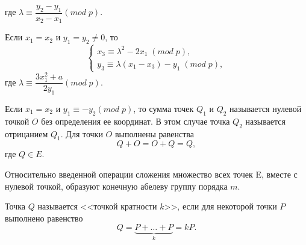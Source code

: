где $\lambda \equiv \dfrac{y_2-y_1}{x_2-x_1}(mod\;p)$.
\\
\par
Если $x_1 = x_2$ и $y_1 = y_2 \neq 0$, то
\begin{equation}
\begin{cases}
x_3 \equiv \lambda^2 - 2x_1\;(mod\;p),\\
y_3 \equiv \lambda(x_1-x_3) - y_1\;(mod\;p),
\end{cases}
\end{equation}
где $\lambda \equiv \dfrac{3x_1^2+a}{2y_1}(mod\;p)$.
\\
\par
Если $x_1 = x_2$ и $y_1 \equiv -y_2(mod\;p)$, то сумма точек $Q_1$ и $Q_2$ называется нулевой точкой $O$ без определения ее координат. В этом случае точка $Q_2$ называется отрицанием $Q_1$. Для точки $O$ выполнены равенства
\begin{equation}
Q+O=O+Q=Q,
\end{equation}
где $Q\in E$.
\par
Относительно введенной операции сложения множество всех точек E, вместе с нулевой точкой, образуют конечную абелеву группу порядка $m$.
\par
Точка $Q$ называется <<точкой кратности $k$>>, если для некоторой точки $P$ выполнено равенство
\begin{equation}\label{eq:kP}
Q=\underbrace{P+\dots+P}_k=kP.
\end{equation}

